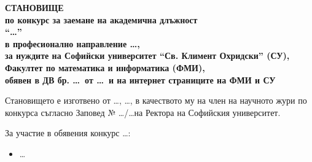 \documentclass[a4paper]{report}
\def\assocprof{доцент}
\def\prof{професор}
\def\position{\ldots}          %
\def\statepaperno{\ldots}      %
\def\statepaperdate{\ldots}    %
\def\reviewer{\ldots}          %
\def\reviewerprofarea{\ldots}  %
\def\orderno{\ldots}           %
\def\orderdate{\ldots}         %
\def\singlecandidate{е подал документи \textbf{единствен кандидат}}
\def\manycandidates{са подали документи \textbg{следните кандидати}}
\def\candidatenumber{\ldots}        %
\newcommand{\candidate}[1]{\item #1}
\newenvironment{candidates}{\begin{itemize}}{\end{itemize}}
\begin{document}
\begin{center}
  \Large\bfseries\MakeUppercase{Становище}\\
  \small
  по конкурс за заемане на академична длъжност\\
  ``\position''\\
  в професионално направление \position,\\
  за нуждите на Софийски университет ``Св. Климент Охридски'' (СУ),\\
  Факултет по математика и информатика (ФМИ),\\
  обявен в ДВ бр. \statepaperno\ от \statepaperdate\ и на интернет страниците на ФМИ и СУ
\end{center}

Становището е изготвено от \reviewer, \reviewerprofarea, в качеството му на член на научното жури по конкурса съгласно Заповед № \orderno/\orderdate на Ректора на Софийския университет.

За участие в обявения конкурс \candidatenumber:

\begin{candidates}
\candidate{\ldots} %
\end{candidates}
\end{document}
